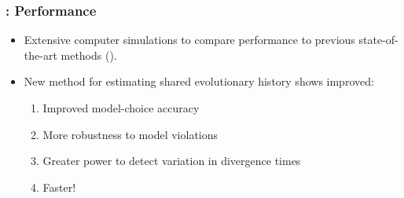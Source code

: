 \begin{frame}
    \frametitle{\dppmsbayes: Performance}
    \begin{itemize}
        \item<1-> Extensive computer simulations to compare performance to previous
            state-of-the-art methods (\msb).
        \item<2-> New method for estimating shared evolutionary history shows
            improved:
            \begin{enumerate}
                \item<2-> Improved model-choice accuracy 
                \item<2-> More robustness to model violations
                \item<2-> Greater power to detect variation in divergence times
                \item<2-> Faster!
            \end{enumerate}
    \end{itemize}

\end{frame}

